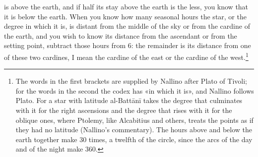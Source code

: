 \documentclass[11pt]{article}
\begin{document}
is above the earth, and if half its stay above the earth is the less, you know that it is below the earth. When you know how many seasonal hours the star, or the degree in which it is, is distant from the middle of the sky or from the cardine of the earth, and you wish to know its distance from the ascendant or from the setting point, subtract those hours from 6: the remainder is its distance from one of these two cardines, I mean the cardine of the east or the cardine of the west.\footnote{The words in the first brackets are supplied by Nallino after Plato of Tivoli; for the words in the second the codex has «in which it is», and Nallino follows Plato. For a star with latitude al-Battānī takes the degree that culminates with it for the right ascensions and the degree that rises with it for the oblique ones, where Ptolemy, like Alcabitius and others, treats the points as if they had no latitude (Nallino's commentary). The hours above and below the earth together make 30 times, a twelfth of the circle, since the arcs of the day and of the night make 360.}\par
\end{document}
